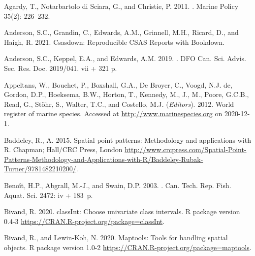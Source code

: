 \documentclass[12pt]{article}\usepackage[]{graphicx}\usepackage[]{color}
\begin{document}
\hypertarget{refs}{}
\begin{CSLReferences}{1}{0}
\leavevmode\hypertarget{ref-Agardy:2011}{}%
Agardy, T., Notarbartolo di Sciara, G., and Christie, P. 2011. . Marine Policy 35(2): 226--232.

\leavevmode\hypertarget{ref-R:csasdown}{}%
Anderson, S.C., Grandin, C., Edwards, A.M., Grinnell, M.H., Ricard, D., and Haigh, R. 2021. Csasdown: {R}eproducible {CSAS} {R}eports with {B}ookdown.

\leavevmode\hypertarget{ref-Anderson:2019}{}%
Anderson, S.C., Keppel, E.A., and Edwards, A.M. 2019. . DFO Can. Sci. Advis. Sec. Res. Doc. 2019/041. vii + 321 p.

\leavevmode\hypertarget{ref-WoRMS}{}%
Appeltans, W., Bouchet, P., Boxshall, G.A., De Broyer, C., Voogd, N.J. de, Gordon, D.P., Hoeksema, B.W., Horton, T., Kennedy, M., J., M., Poore, G.C.B., Read, G., Stöhr, S., Walter, T.C., and Costello, M.J. (\emph{Editors}). 2012. World register of marine species. Accessed at \url{http://www.marinespecies.org} on 2020-12-1.

\leavevmode\hypertarget{ref-R:package:spatstat}{}%
Baddeley, R., A. 2015. Spatial point patterns: Methodology and applications with {R}. Chapman; Hall/CRC Press, London \url{http://www.crcpress.com/Spatial-Point-Patterns-Methodology-and-Applications-with-R/Baddeley-Rubak-Turner/9781482210200/}.

\leavevmode\hypertarget{ref-Benoit:etal:2003:techreport}{}%
Benoît, H.P., Abgrall, M.-J., and Swain, D.P. 2003. . Can. Tech. Rep. Fish. Aquat. Sci. 2472: iv + 183~p.

\leavevmode\hypertarget{ref-R:package:classInt}{}%
Bivand, R. 2020. classInt: Choose univariate class intervals. R package version 0.4-3 \url{https://CRAN.R-project.org/package=classInt}.

\leavevmode\hypertarget{ref-R:package:maptools}{}%
Bivand, R., and Lewin-Koh, N. 2020. Maptools: Tools for handling spatial objects. R package version 1.0-2 \url{https://CRAN.R-project.org/package=maptools}.


\end{CSLReferences}
\end{document}
